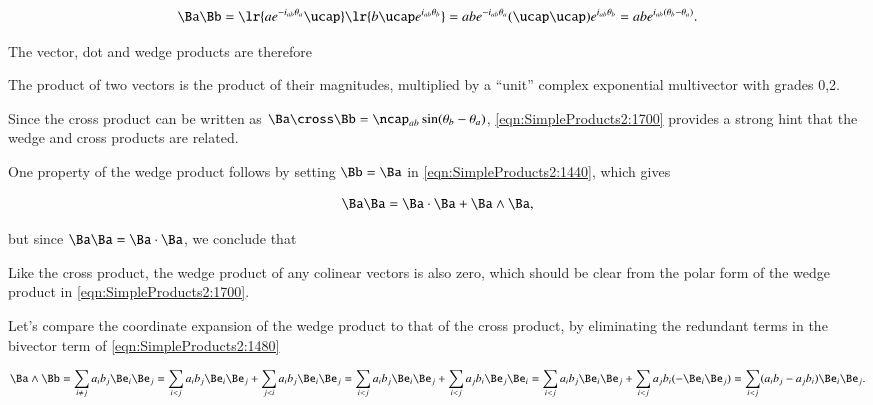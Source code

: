 \begin{dmath}\label{eqn:SimpleProducts2:1680}
\Ba \Bb
=
\lr{ a e^{ -i_{ab} \theta_a } \ucap } \lr{ b \ucap e^{ i_{ab} \theta_b } }
=
a b
e^{ -i_{ab} \theta_a } ( \ucap \ucap ) e^{ i_{ab} \theta_b }
=
a b
e^{ i_{ab} (\theta_b - \theta_a)}.
\end{dmath}

The vector, dot and wedge products are therefore


The product of two vectors is the product of their magnitudes, multiplied by a ``unit'' complex exponential multivector with grades 0,2.

Since the cross product can be written as \( \Ba \cross \Bb = \ncap_{ab} \sin(\theta_b - \theta_a) \),
\cref{eqn:SimpleProducts2:1700} provides a strong hint that the
wedge and cross products are related.

One property of the wedge product follows by setting \( \Bb = \Ba \) in
\cref{eqn:SimpleProducts2:1440}, which gives

\begin{dmath}\label{eqn:SimpleProducts2:1500}
\Ba \Ba = \Ba \cdot \Ba + \Ba \wedge \Ba,
\end{dmath}

but since \( \Ba \Ba = \Ba \cdot \Ba \), we conclude that


Like the cross product, the
wedge product of any colinear vectors is also zero, which should be clear from the polar form
of the wedge product in
\cref{eqn:SimpleProducts2:1700}.

Let's compare the coordinate expansion of the wedge product to that of the cross product, by
eliminating the redundant terms in the bivector term of \cref{eqn:SimpleProducts2:1480}

\begin{dmath}\label{eqn:SimpleProducts2:1460}
\Ba \wedge \Bb
=
\sum_{i \ne j} a_i b_j \Be_i \Be_j
=
\sum_{i < j} a_i b_j \Be_i \Be_j
+
\sum_{j < i} a_i b_j \Be_i \Be_j
=
\sum_{i < j} a_i b_j \Be_i \Be_j
+
\sum_{i < j} a_j b_i \Be_j \Be_i
=
\sum_{i < j} a_i b_j \Be_i \Be_j
+
\sum_{i < j} a_j b_i (-\Be_i \Be_j)
=
\sum_{i < j} (a_i b_j - a_j b_i) \Be_i \Be_j.
\end{dmath}

